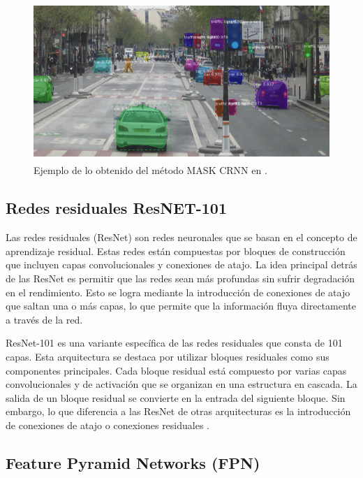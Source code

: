 \begin{figure} [!h]
    \begin{center}
    \includegraphics[height=6cm]{images/mask_crnn.png} 
    \caption{\label{fig:mask_crnn} Ejemplo de lo obtenido del método MASK CRNN en \cite{matterport_maskrcnn_2017}.}
    \end{center}
\end{figure}


\subsection{Redes residuales ResNET-101}

Las redes residuales (ResNet) son redes neuronales que se basan en el concepto de aprendizaje residual. Estas redes están compuestas por bloques de construcción que incluyen capas convolucionales y conexiones de atajo. La idea principal detrás de las ResNet es permitir que las redes sean más profundas sin sufrir degradación en el rendimiento. Esto se logra mediante la introducción de conexiones de atajo que saltan una o más capas, lo que permite que la información fluya directamente a través de la red. 

ResNet-101 es una variante específica de las redes residuales que consta de 101 capas. Esta arquitectura se destaca por utilizar bloques residuales como sus componentes principales. Cada bloque residual está compuesto por varias capas convolucionales y de activación que se organizan en una estructura en cascada. La salida de un bloque residual se convierte en la entrada del siguiente bloque. Sin embargo, lo que diferencia a las ResNet de otras arquitecturas es la introducción de conexiones de atajo o conexiones residuales \cite{cite:Kaiming}.

\subsection{Feature Pyramid Networks (FPN)}

